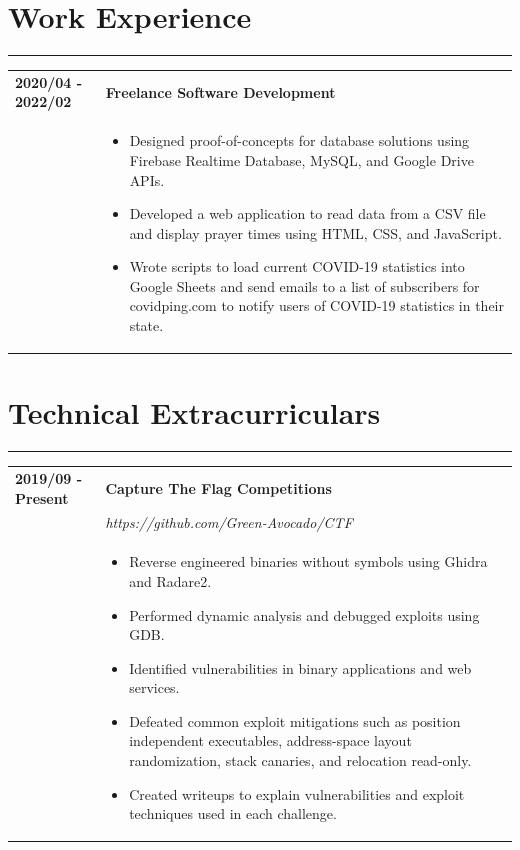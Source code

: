 \documentclass[letterpaper]{article}
\newcommand{\sect}[1]{\section*{#1}
                        {\color{cyan}
                        \rule{\textwidth}{1pt}
                        \vspace{-1ex}}}
\begin{document}
    \sect{Work Experience}

        \begin{tabular}{p{} p{}}
            \textbf{2020/04 - 2022/02} & \textbf{Freelance Software Development} \\
            & \begin{itemize}
                \item Designed proof-of-concepts for database solutions using Firebase Realtime Database,
                    MySQL, and Google Drive APIs.
                \item Developed a web application to read data from a CSV file and display prayer times
                    using HTML, CSS, and JavaScript.
                \item Wrote scripts to load current COVID-19 statistics into Google Sheets and send emails
                    to a list of subscribers for covidping.com to notify users of COVID-19 statistics in
                    their state.
            \end{itemize}
        \end{tabular}

    \sect{Technical Extracurriculars}

        \begin{tabular}{p{} p{}}
            \textbf{2019/09 - Present} & \textbf{Capture The Flag Competitions} \\
            & \emph{https://github.com/Green-Avocado/CTF} \\
            & \begin{itemize}
                \item Reverse engineered binaries without symbols using Ghidra and Radare2.
                \item Performed dynamic analysis and debugged exploits using GDB.
                \item Identified vulnerabilities in binary applications and web services.
                \item Defeated common exploit mitigations such as position independent executables,
                    address-space layout randomization, stack canaries, and relocation read-only.
                \item Created writeups to explain vulnerabilities and exploit techniques used in each
                    challenge.
            \end{itemize}
            \\
        \end{tabular}
\end{document}
